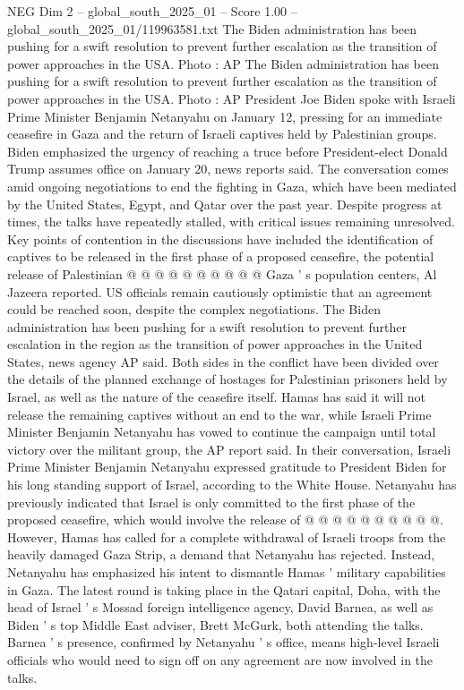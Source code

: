 \begin{textsample}{NEG Dim 2 – global\_south\_2025\_01 – Score 1.00 – global\_south\_2025\_01/119963581.txt}  \label{ex:f2_neg_136}
The Biden administration has been pushing for a swift resolution to prevent further escalation as the transition of power approaches in the USA.
Photo : AP The Biden administration has been pushing for a swift resolution to prevent further escalation as the transition of power approaches in the USA.
Photo : AP President Joe Biden spoke with Israeli Prime Minister Benjamin Netanyahu on January 12, pressing for an immediate ceasefire in Gaza and the return of Israeli captives held by Palestinian groups.
Biden emphasized the urgency of reaching a truce before President-elect Donald Trump assumes office on January 20, news reports said.
The conversation comes amid ongoing negotiations to end the fighting in Gaza, which have been mediated by the United States, Egypt, and Qatar over the past year.
Despite progress at times, the talks have repeatedly stalled, with critical issues remaining unresolved.
Key points of contention in the discussions have included the identification of captives to be released in the first phase of a proposed ceasefire, the potential release of Palestinian @ @ @ @ @ @ @ @ @ @ Gaza ' s population centers, Al Jazeera reported.
US officials remain cautiously optimistic that an agreement could be reached soon, despite the complex negotiations.
The Biden administration has been pushing for a swift resolution to prevent further escalation in the region as the transition of power approaches in the United States, news agency AP said.
Both sides in the conflict have been divided over the details of the planned exchange of hostages for Palestinian prisoners held by Israel, as well as the nature of the ceasefire itself.
Hamas has said it will not release the remaining captives without an end to the war, while Israeli Prime Minister Benjamin Netanyahu has vowed to continue the campaign until total victory over the militant group, the AP report said.
In their conversation, Israeli Prime Minister Benjamin Netanyahu expressed gratitude to President Biden for his long standing support of Israel, according to the White House.
Netanyahu has previously indicated that Israel is only committed to the first phase of the proposed ceasefire, which would involve the release of @ @ @ @ @ @ @ @ @ @.
However, Hamas has called for a complete withdrawal of Israeli troops from the heavily damaged Gaza Strip, a demand that Netanyahu has rejected.
Instead, Netanyahu has emphasized his intent to dismantle Hamas ' military capabilities in Gaza.
The latest round is taking place in the Qatari capital, Doha, with the head of Israel ' s Mossad foreign intelligence agency, David Barnea, as well as Biden ' s top Middle East adviser, Brett McGurk, both attending the talks.
Barnea ' s presence, confirmed by Netanyahu ' s office, means high-level Israeli officials who would need to sign off on any agreement are now involved in the talks.

\end{textsample}
